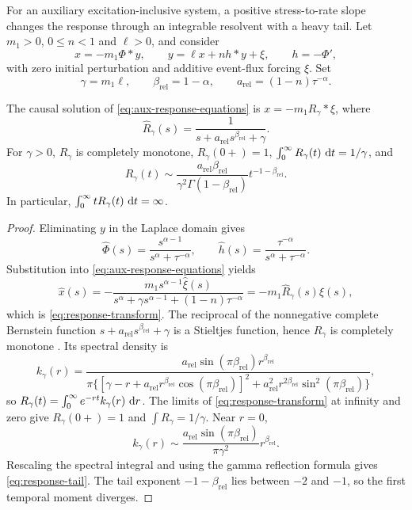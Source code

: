 For an auxiliary excitation-inclusive system, a positive stress-to-rate slope changes the response through an integrable resolvent with a heavy tail. Let \(m_1>0\), \(0\leq n<1\) and \(\ell>0\), and consider
\begin{equation}\label{eq:aux-response-equations}
x=-m_1\Phi*y,\qquad
y=\ell x+nh*y+\xi,\qquad
h=-\Phi',
\end{equation}
with zero initial perturbation and additive event-flux forcing \(\xi\). Set
\[
\gamma=m_1\ell,\qquad \beta_{\mathrm{rel}}=1-\alpha,\qquad
a_{\mathrm{rel}}=(1-n)\tau^{-\alpha}.
\]

\begin{proposition}\label{prop:auxiliary-response}
The causal solution of \eqref{eq:aux-response-equations} is
\(x=-m_1R_\gamma*\xi\), where
\begin{equation}\label{eq:response-transform}
\widehat R_\gamma(s)=\frac{1}{s+a_{\mathrm{rel}} s^{\beta_{\mathrm{rel}}}+\gamma}.
\end{equation}
For \(\gamma>0\), \(R_\gamma\) is completely monotone, \(R_\gamma(0+)=1\), \(\int_0^\infty R_\gamma(t)\,\mathop{}\!\mathrm{d} t=1/\gamma\), and
\begin{equation}\label{eq:response-tail}
R_\gamma(t)\sim
\frac{a_{\mathrm{rel}}\beta_{\mathrm{rel}}}{\gamma^2\Gamma(1-\beta_{\mathrm{rel}})}t^{-1-\beta_{\mathrm{rel}}}.
\end{equation}
In particular, \(\int_0^\infty tR_\gamma(t)\,\mathop{}\!\mathrm{d} t=\infty\).
\end{proposition}

\begin{proof}
Eliminating \(y\) in the Laplace domain gives
\[
\widehat\Phi(s)=\frac{s^{\alpha-1}}{s^\alpha+\tau^{-\alpha}},
\qquad
\widehat h(s)=\frac{\tau^{-\alpha}}{s^\alpha+\tau^{-\alpha}}.
\]
Substitution into \eqref{eq:aux-response-equations} yields
\[
\widehat x(s)=-\frac{m_1s^{\alpha-1}\widehat\xi(s)}
{s^\alpha+\gamma s^{\alpha-1}+(1-n)\tau^{-\alpha}}
=-m_1\widehat R_\gamma(s)\widehat\xi(s),
\]
which is \eqref{eq:response-transform}. The reciprocal of the nonnegative complete Bernstein function \(s+a_{\mathrm{rel}} s^{\beta_{\mathrm{rel}}}+\gamma\) is a Stieltjes function, hence \(R_\gamma\) is completely monotone
\citep[Section~2.1]{MeerschaertToaldo2019}. Its spectral density is
\[
k_\gamma(r)=
\frac{a_{\mathrm{rel}}\sin(\pi\beta_{\mathrm{rel}})r^{\beta_{\mathrm{rel}}}}
{\pi\{[\gamma-r+a_{\mathrm{rel}} r^{\beta_{\mathrm{rel}}}\cos(\pi\beta_{\mathrm{rel}})]^2+
a_{\mathrm{rel}}^2r^{2\beta_{\mathrm{rel}}}\sin^2(\pi\beta_{\mathrm{rel}})\}},
\]
so \(R_\gamma(t)=\int_0^\infty e^{-rt}k_\gamma(r)\,\mathop{}\!\mathrm{d} r\). The limits of \eqref{eq:response-transform} at infinity and zero give \(R_\gamma(0+)=1\) and \(\int R_\gamma=1/\gamma\). Near \(r=0\),
\[
k_\gamma(r)\sim
\frac{a_{\mathrm{rel}}\sin(\pi\beta_{\mathrm{rel}})}{\pi\gamma^2}r^{\beta_{\mathrm{rel}}}.
\]
Rescaling the spectral integral and using the gamma reflection formula gives \eqref{eq:response-tail}. The tail exponent \(-1-\beta_{\mathrm{rel}}\) lies between \(-2\) and \(-1\), so the first temporal moment diverges.
\end{proof}

